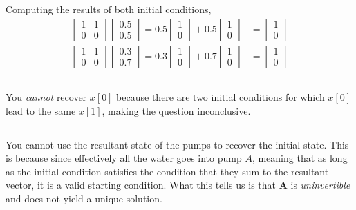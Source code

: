 \documentclass[]{article}
\begin{document}
Computing the results of both initial conditions,
\begin{align}
	\begin{bmatrix}
	1 & 1 \\
	0 & 0
	\end{bmatrix}
	\begin{bmatrix}
	0.5 \\
	0.5
	\end{bmatrix}
	=
	0.5 \begin{bmatrix}
	1 \\
	0
	\end{bmatrix}
	+ 
	0.5 \begin{bmatrix}
	1 \\
	0
	\end{bmatrix}
	&=
	\begin{bmatrix}
	1 \\
	0
	\end{bmatrix} \\
	\begin{bmatrix}
	1 & 1 \\
	0 & 0
	\end{bmatrix}
	\begin{bmatrix}
	0.3 \\
	0.7
	\end{bmatrix}
	=
	0.3 \begin{bmatrix}
	1 \\
	0
	\end{bmatrix}
	+ 
	0.7 \begin{bmatrix}
	1 \\
	0
	\end{bmatrix}
	&=
	\begin{bmatrix}
	1 \\
	0
	\end{bmatrix}
\end{align}

\subsection{}

You \emph{cannot} recover \(x[0]\) because there are two initial conditions for which \(x[0]\) lead to the same \(x[1]\), making the question inconclusive. 

\subsection{}

You cannot use the resultant state of the pumps to recover the initial state. This is because since effectively all the water goes into pump \(A\), meaning that as long as the initial condition satisfies the condition that they sum to the resultant vector, it is a valid starting condition. What this tells us is that \(\mathbf{A}\) is \emph{uninvertible} and does not yield a unique solution. 
\end{document}
